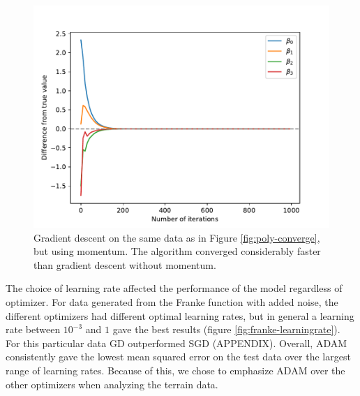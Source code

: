 \begin{figure}
    \centering
    \includegraphics[width=0.99\linewidth]{examples/tests_even/figs/gradient-descent-momentum-polynomial-convergence.pdf}
    \caption{Gradient descent on the same data as in Figure \ref{fig:poly-converge}, but using momentum. The algorithm converged considerably faster than gradient descent without momentum.}
    \label{fig:poly-converge-momentum}
\end{figure}

The choice of learning rate affected the performance of the model regardless of optimizer. For data generated from the Franke function \cite{franke1979} with added noise, the different optimizers had different optimal learning rates, but in general a learning rate between $10^{-3}$ and $1$ gave the best results (figure \ref{fig:franke-learningrate}). For this particular data GD outperformed SGD (APPENDIX). Overall, ADAM consistently gave the lowest mean squared error on the test data over the largest range of learning rates. Because of this, we chose to emphasize ADAM over the other optimizers when analyzing the terrain data.

